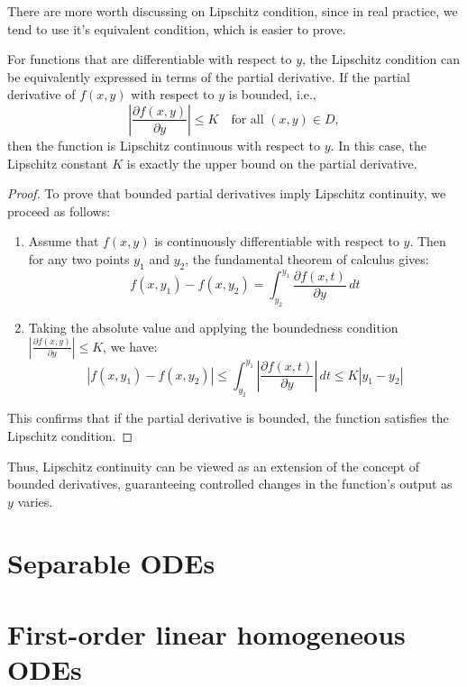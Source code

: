 There are more worth discussing on Lipschitz condition, since in real practice, we tend to use it's equivalent condition, which is easier to prove. 
\begin{corollary}
    For functions that are differentiable with respect to \( y \), the Lipschitz condition can be equivalently expressed in terms of the partial derivative. If the partial derivative of \( f(x, y) \) with respect to \( y \) is bounded, i.e.,
\[
\left| \frac{\partial f(x, y)}{\partial y} \right| \leq K \quad \text{for all } (x, y) \in D,
\]
then the function is Lipschitz continuous with respect to \( y \). In this case, the Lipschitz constant \( K \) is exactly the upper bound on the partial derivative.
\end{corollary}
\begin{proof}
To prove that bounded partial derivatives imply Lipschitz continuity, we proceed as follows:

\begin{enumerate}
    \item Assume that \( f(x, y) \) is continuously differentiable with respect to \( y \). Then for any two points \( y_1 \) and \( y_2 \), the fundamental theorem of calculus gives:
\[
f(x, y_1) - f(x, y_2) = \int_{y_2}^{y_1} \frac{\partial f(x, t)}{\partial y} \, dt
\]
    \item Taking the absolute value and applying the boundedness condition \( \left| \frac{\partial f(x, y)}{\partial y} \right| \leq K \), we have:
\[
|f(x, y_1) - f(x, y_2)| \leq \int_{y_2}^{y_1} \left| \frac{\partial f(x, t)}{\partial y} \right| \, dt \leq K |y_1 - y_2|
\]
\end{enumerate}

This confirms that if the partial derivative is bounded, the function satisfies the Lipschitz condition.
\end{proof}
 Thus, Lipschitz continuity can be viewed as an extension of the concept of bounded derivatives, guaranteeing controlled changes in the function's output as \( y \) varies.



\section{Separable ODEs}

\section{First-order linear homogeneous ODEs}

